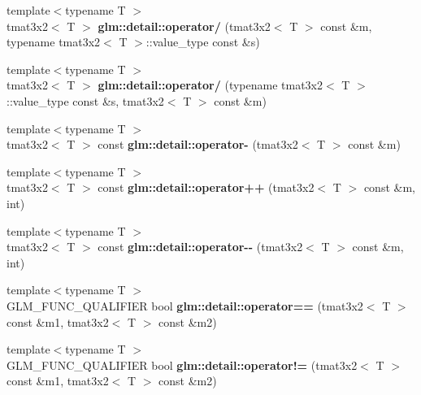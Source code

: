 \begin{DoxyCompactItemize}
\item 
\hypertarget{namespaceglm_1_1detail_a67b7b75885a5798b1460334d987b768f}{{\footnotesize template$<$typename T $>$ }\\tmat3x2$<$ \-T $>$ {\bfseries glm\-::detail\-::operator/} (tmat3x2$<$ \-T $>$ const \&m, typename tmat3x2$<$ \-T $>$\-::value\-\_\-type const \&s)}\label{namespaceglm_1_1detail_a67b7b75885a5798b1460334d987b768f}

\item 
\hypertarget{namespaceglm_1_1detail_a86990449e1ad89a8fa56dfb8f857fa91}{{\footnotesize template$<$typename T $>$ }\\tmat3x2$<$ \-T $>$ {\bfseries glm\-::detail\-::operator/} (typename tmat3x2$<$ \-T $>$\-::value\-\_\-type const \&s, tmat3x2$<$ \-T $>$ const \&m)}\label{namespaceglm_1_1detail_a86990449e1ad89a8fa56dfb8f857fa91}

\item 
\hypertarget{namespaceglm_1_1detail_aec4c18ab342bbdf76e8217a9061ff84c}{{\footnotesize template$<$typename T $>$ }\\tmat3x2$<$ \-T $>$ const {\bfseries glm\-::detail\-::operator-\/} (tmat3x2$<$ \-T $>$ const \&m)}\label{namespaceglm_1_1detail_aec4c18ab342bbdf76e8217a9061ff84c}

\item 
\hypertarget{namespaceglm_1_1detail_ad471ad940329ff5a0726310c4fd80125}{{\footnotesize template$<$typename T $>$ }\\tmat3x2$<$ \-T $>$ const {\bfseries glm\-::detail\-::operator++} (tmat3x2$<$ \-T $>$ const \&m, int)}\label{namespaceglm_1_1detail_ad471ad940329ff5a0726310c4fd80125}

\item 
\hypertarget{namespaceglm_1_1detail_a415841fb7bd39fab02b54001d087a450}{{\footnotesize template$<$typename T $>$ }\\tmat3x2$<$ \-T $>$ const {\bfseries glm\-::detail\-::operator-\/-\/} (tmat3x2$<$ \-T $>$ const \&m, int)}\label{namespaceglm_1_1detail_a415841fb7bd39fab02b54001d087a450}

\item 
\hypertarget{namespaceglm_1_1detail_a711bd8cb73c40bf9f6036f13a8d8201d}{{\footnotesize template$<$typename T $>$ }\\\-G\-L\-M\-\_\-\-F\-U\-N\-C\-\_\-\-Q\-U\-A\-L\-I\-F\-I\-E\-R bool {\bfseries glm\-::detail\-::operator==} (tmat3x2$<$ \-T $>$ const \&m1, tmat3x2$<$ \-T $>$ const \&m2)}\label{namespaceglm_1_1detail_a711bd8cb73c40bf9f6036f13a8d8201d}

\item 
\hypertarget{namespaceglm_1_1detail_a186f05d94039d3ce63c15a4426294ea2}{{\footnotesize template$<$typename T $>$ }\\\-G\-L\-M\-\_\-\-F\-U\-N\-C\-\_\-\-Q\-U\-A\-L\-I\-F\-I\-E\-R bool {\bfseries glm\-::detail\-::operator!=} (tmat3x2$<$ \-T $>$ const \&m1, tmat3x2$<$ \-T $>$ const \&m2)}\label{namespaceglm_1_1detail_a186f05d94039d3ce63c15a4426294ea2}

\end{DoxyCompactItemize}


